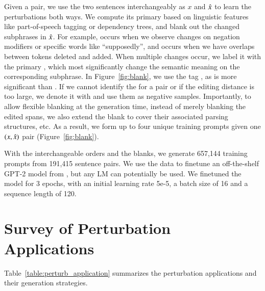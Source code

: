 Given a pair, we use the two sentences interchangeably as $x$ and $\hat{x}$ to learn the perturbations both ways.
We compute its primary \tagstr based on linguistic features like part-of-speech tagging or dependency trees, and blank out the changed subphrases in $\hat{x}$.
For example,  occurs when we observe changes on negation modifiers or specific words like ``supposedly'', and  occurs when we have overlaps between tokens deleted and added.
When multiple changes occur, we label it with the primary \tagstr, which most significantly change the semantic meaning on the corresponding subphrase.
In Figure~\ref{fig:blank}, we use the tag , as  is more significant than .
If we cannot identify the \tagstr for a pair or if the editing distance is too large, we denote it with \ctrltag{[global]} and use them as negative samples.
Importantly, to allow flexible blanking at the generation time, instead of merely blanking the edited spans, we also extend the blank to cover their associated parsing structures, etc.
As a result, we form up to four unique training prompts given one $(x, \hat{x})$ pair (Figure~\ref{fig:blank}).


With the interchangeable orders and the blanks, we generate 657,144 training prompts from 191,415 sentence pairs.
We use the data to finetune an off-the-shelf GPT-2 model from \citet{Wolf2019HuggingFacesTS}, but any LM can potentially be used.
We finetuned the model for 3 epochs, with an initial learning rate 5e-5, a batch size of 16 and a sequence length of 120.




\section{Survey of Perturbation Applications}
\label{appendix:paper_survey}


Table~\ref{table:perturb_application} summarizes the perturbation applications and their generation strategies.
